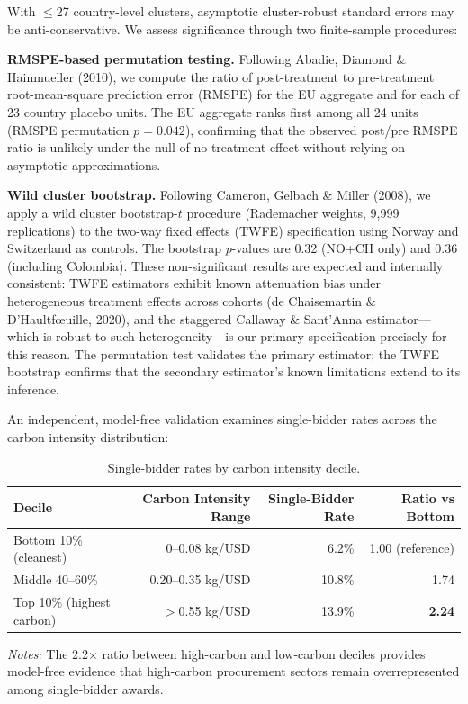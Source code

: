 \documentclass[11pt]{article}
\newcommand{\tabnoteblock}[1]{%
    \par\vspace{0.45em}%
    \begin{minipage}{0.98\linewidth}
    \footnotesize\raggedright #1
    \end{minipage}\par
}
\newcommand{\tabnotes}[1]{\tabnoteblock{\textit{Notes:} #1}}
\begin{document}
With $\leq$27 country-level clusters, asymptotic cluster-robust standard errors may be anti-conservative. We assess significance through two finite-sample procedures:

\textbf{RMSPE-based permutation testing.} Following Abadie, Diamond \& Hainmueller (2010), we compute the ratio of post-treatment to pre-treatment root-mean-square prediction error (RMSPE) for the EU aggregate and for each of 23 country placebo units. The EU aggregate ranks first among all 24 units (RMSPE permutation $p = 0.042$), confirming that the observed post/pre RMSPE ratio is unlikely under the null of no treatment effect without relying on asymptotic approximations.

\textbf{Wild cluster bootstrap.} Following Cameron, Gelbach \& Miller (2008), we apply a wild cluster bootstrap-$t$ procedure (Rademacher weights, 9,999 replications) to the two-way fixed effects (TWFE) specification using Norway and Switzerland as controls. The bootstrap $p$-values are 0.32 (NO+CH only) and 0.36 (including Colombia). These non-significant results are expected and internally consistent: TWFE estimators exhibit known attenuation bias under heterogeneous treatment effects across cohorts (de Chaisemartin \& D'Haultf{\oe}uille, 2020), and the staggered Callaway \& Sant'Anna estimator---which is robust to such heterogeneity---is our primary specification precisely for this reason. The permutation test validates the primary estimator; the TWFE bootstrap confirms that the secondary estimator's known limitations extend to its inference.

An independent, model-free validation examines single-bidder rates across the carbon intensity distribution:

\begin{table}[H]
\centering
\caption{Single-bidder rates by carbon intensity decile.}
\label{tab:extreme}
\small
\begin{tabular}{lrrr}
\toprule
\textbf{Decile} & \textbf{Carbon Intensity Range} & \textbf{Single-Bidder Rate} & \textbf{Ratio vs Bottom} \\
\midrule
Bottom 10\% (cleanest) & 0--0.08 kg/USD & 6.2\% & 1.00 (reference) \\
Middle 40--60\% & 0.20--0.35 kg/USD & 10.8\% & 1.74 \\
Top 10\% (highest carbon) & $>$0.55 kg/USD & 13.9\% & \textbf{2.24} \\
\bottomrule
\end{tabular}

\tabnotes{The 2.2$\times$ ratio between high-carbon and low-carbon deciles provides model-free evidence that high-carbon procurement sectors remain overrepresented among single-bidder awards.
}
\end{table}
\end{document}
